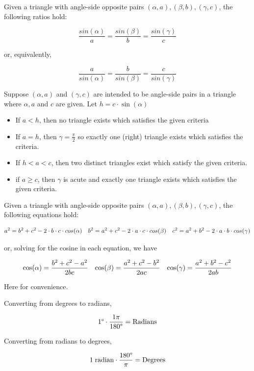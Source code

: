 \begin{problem}
    Given a triangle with angle-side opposite pairs $(\alpha, a), (\beta, b), (\gamma, c)$, the following ratios hold:
    
    \[ \frac{sin(\alpha)}{a} = \frac{sin(\beta)}{b} = \frac{sin(\gamma)}{c}\]
    
    or, equivalently, 
    
    \[ \frac{a}{sin(\alpha)} = \frac{b}{sin(\beta)} = \frac{c}{sin(\gamma)}\]
\end{problem}

\begin{problem}[Theorem 2.]
    Suppose $(\alpha, a)$ and $(\gamma, c)$ are intended to be angle-side pairs in a triangle where $\alpha, a$ and $c$ are given. Let $h = c \cdot \sin(\alpha)$
    
    \begin{itemize}
        \item If $a < h$, then no triangle exists which satisfies the given criteria 
        \item If $a = h$, then $\gamma = \frac{\pi}{2}$ so exactly one (right) triangle exists which satisfies the criteria.
        \item If $h < a < c$, then two distinct triangles exist which satisfy the given criteria.
        \item if $a \geq c$, then $\gamma$ is acute and exactly one triangle exists which satisfies the given criteria.
    \end{itemize}
\end{problem}

\begin{problem}
    Given a triangle with angle-side opposite pairs $(\alpha, a), (\beta, b), (\gamma, c)$, the following equations hold:
    
    \begin{align}
        \notag a^2 = b^2 + c^2 - 2 \cdot b \cdot c \cdot cos(\alpha) && b^2 = a^2 + c^2 - 2 \cdot a \cdot c \cdot cos(\beta) && c^2 = a^2 + b^2 - 2 \cdot a \cdot b \cdot cos(\gamma)
    \end{align}
    
    or, solving for the cosine in each equation, we have
    
    \begin{align}
        \notag \cos(\alpha) = \frac{b^2 + c^2 - a^2}{2bc} && \cos(\beta) = \frac{a^2 + c^2 - b^2}{2ac} && \cos(\gamma) = \frac{a^2 + b^2 - c^2}{2ab}
    \end{align}
\end{problem}

\begin{problem}
    Here for convenience.
    
    Converting from degrees to radians,
    
    \[1\degree \cdot \frac{1\pi}{180\degree} = \text{Radians}\]
    
    Converting from radians to degrees,
    
    \[1 \; \text{radian} \cdot \frac{180\degree}{\pi} = \text{Degrees}\]
\end{problem}